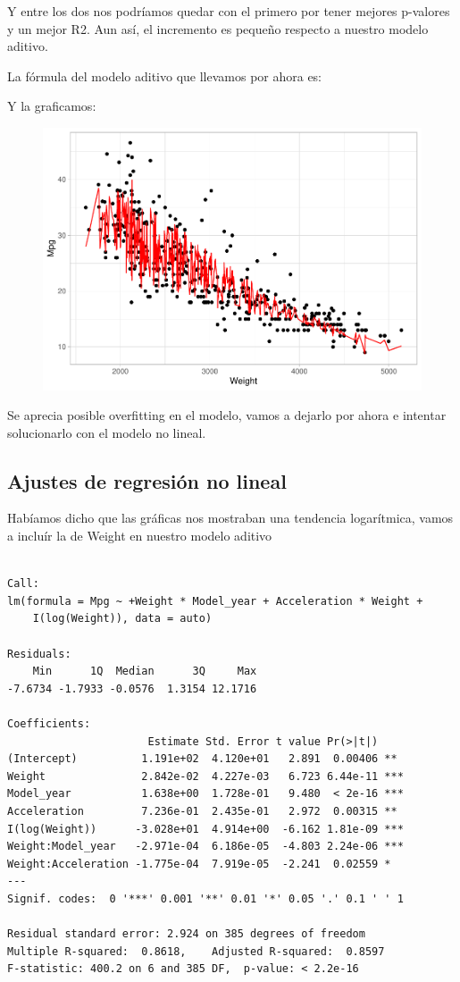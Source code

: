 Y entre los dos nos podríamos quedar con el primero por tener mejores p-valores y un mejor R2. Aun así, el incremento es pequeño respecto a nuestro modelo aditivo.

La fórmula del modelo aditivo que llevamos por ahora es:

Y la graficamos:

\begin{figure}[H]\includegraphics[width=.9\linewidth]{img/Regresion_files/figure-latex/unnamed-chunk-16-1} \caption{}\end{figure}

Se aprecia posible overfitting en el modelo, vamos a dejarlo por ahora e intentar solucionarlo con el modelo no lineal.

\subsection{Ajustes de regresión no lineal}

Habíamos dicho que las gráficas nos mostraban una tendencia logarítmica, vamos a incluír la de Weight en nuestro modelo aditivo

\begin{verbatim}

Call:
lm(formula = Mpg ~ +Weight * Model_year + Acceleration * Weight + 
    I(log(Weight)), data = auto)

Residuals:
    Min      1Q  Median      3Q     Max 
-7.6734 -1.7933 -0.0576  1.3154 12.1716 

Coefficients:
                      Estimate Std. Error t value Pr(>|t|)    
(Intercept)          1.191e+02  4.120e+01   2.891  0.00406 ** 
Weight               2.842e-02  4.227e-03   6.723 6.44e-11 ***
Model_year           1.638e+00  1.728e-01   9.480  < 2e-16 ***
Acceleration         7.236e-01  2.435e-01   2.972  0.00315 ** 
I(log(Weight))      -3.028e+01  4.914e+00  -6.162 1.81e-09 ***
Weight:Model_year   -2.971e-04  6.186e-05  -4.803 2.24e-06 ***
Weight:Acceleration -1.775e-04  7.919e-05  -2.241  0.02559 *  
---
Signif. codes:  0 '***' 0.001 '**' 0.01 '*' 0.05 '.' 0.1 ' ' 1

Residual standard error: 2.924 on 385 degrees of freedom
Multiple R-squared:  0.8618,    Adjusted R-squared:  0.8597 
F-statistic: 400.2 on 6 and 385 DF,  p-value: < 2.2e-16
\end{verbatim}

